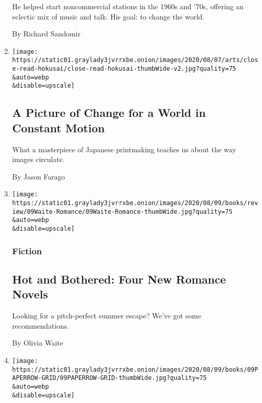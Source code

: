 \begin{enumerate}
  He helped start noncommercial stations in the 1960s and '70s, offering
  an eclectic mix of music and talk. His goal: to change the world.

  By Richard Sandomir
\item
  \href{/interactive/2020/08/07/arts/design/hokusai-fuji.html}{}

  \texttt{[image: https://static01.graylady3jvrrxbe.onion/images/2020/08/07/arts/close-read-hokusai/close-read-hokusai-thumbWide-v2.jpg?quality=75\\\&auto=webp\\\&disable=upscale]}

  \hypertarget{a-picture-of-change-for-a-world-in-constant-motion}{%
  \subsection{A Picture of Change for a World in Constant
  Motion}\label{a-picture-of-change-for-a-world-in-constant-motion}}

  What a masterpiece of Japanese printmaking teaches us about the way
  images circulate.

  By Jason Farago
\item
  \href{/2020/08/07/books/review/summer-romance-novels-vanessa-riley.html}{}

  \texttt{[image: https://static01.graylady3jvrrxbe.onion/images/2020/08/09/books/review/09Waite-Romance/09Waite-Romance-thumbWide.jpg?quality=75\\\&auto=webp\\\&disable=upscale]}

  \hypertarget{fiction}{%
  \subsubsection{Fiction}\label{fiction}}

  \hypertarget{hot-and-bothered-four-new-romance-novels}{%
  \subsection{Hot and Bothered: Four New Romance
  Novels}\label{hot-and-bothered-four-new-romance-novels}}

  Looking for a pitch-perfect summer escape? We've got some
  recommendations.

  By Olivia Waite
\item
  \href{/2020/08/07/books/review/new-paperbacks.html}{}

  \texttt{[image: https://static01.graylady3jvrrxbe.onion/images/2020/08/09/books/09PAPERROW-GRID/09PAPERROW-GRID-thumbWide.jpg?quality=75\\\&auto=webp\\\&disable=upscale]}


\end{enumerate}
